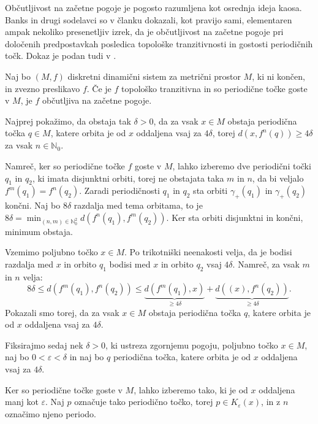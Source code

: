 \documentclass{isrmdelo}
\newcommand{\N}{\mathbb N}
\begin{document}
\bigskip

Občutljivost na začetne pogoje je pogosto razumljena kot osrednja ideja kaosa. Banks in drugi sodelavci so v članku \cite{onchaos} dokazali, kot pravijo sami, elementaren ampak nekoliko presenetljiv izrek, da je občutljivost na začetne pogoje pri določenih predpostavkah posledica topološke tranzitivnosti in gostosti periodičnih točk. Dokaz je podan tudi v \cite{holmgren96,teschl12}.

\begin{izrek}
\label{izrek:obcutljivost}
Naj bo $(M, f)$ diskretni dinamični sistem za metrični prostor $M$, ki ni končen, in zvezno preslikavo $f$. Če je $f$ topološko tranzitivna in so periodične točke goste v $M$, je $f$ občutljiva na začetne pogoje.
\end{izrek}

\begin{dokaz}
Najprej pokažimo, da obstaja tak $\delta > 0$, da za vsak $x \in M$ obstaja periodična točka $q \in M$, katere orbita je od $x$ oddaljena vsaj za $4\delta$, torej $d(x, f^n(q)) \geq 4\delta$ za vsak $n \in \N_0$.

Namreč, ker so periodične točke $f$ goste v $M$, lahko izberemo dve periodični točki $q_1$ in $q_2$, ki imata disjunktni orbiti, torej ne obstajata taka $m$ in $n$, da bi veljalo $f^m(q_1) = f^n(q_2)$. Zaradi periodičnosti $q_1$ in $q_2$ sta orbiti $\gamma_+(q_1)$ in $\gamma_+(q_2)$ končni. Naj bo $8\delta$ razdalja med tema orbitama, to je $8\delta = \min_{(n,m) \in \N_0^2} d(f^n(q_1), f^m(q_2))$. Ker sta orbiti disjunktni in končni, minimum obstaja.

Vzemimo poljubno točko $x \in M$. Po trikotniški neenakosti velja, da je bodisi razdalja med $x$ in orbito $q_1$ bodisi med $x$ in orbito $q_2$ vsaj $4\delta$. Namreč, za vsak $m$ in $n$ velja: $$ 8\delta \leq d(f^m(q_1), f^n(q_2)) \leq \underbrace{d(f^m(q_1), x)}_{\geq 4\delta} + \underbrace{d((x), f^n(q_2))}_{\geq 4\delta}. $$ Pokazali smo torej, da za vsak $x \in M$ obstaja periodična točka $q$, katere orbita je od $x$ oddaljena vsaj za $4\delta$.

\bigskip

Fiksirajmo sedaj nek $\delta > 0$, ki ustreza zgornjemu pogoju, poljubno točko $x \in M$, naj bo $0 < \varepsilon < \delta$ in naj bo $q$ periodična točka, katere orbita je od $x$ oddaljena vsaj za $4\delta$.

Ker so periodične točke goste v $M$, lahko izberemo tako, ki je od $x$ oddaljena manj kot $\varepsilon$. Naj $p$ označuje tako periodično točko, torej $p \in K_\varepsilon(x)$, in z $n$ označimo njeno periodo.


\end{dokaz}
\end{document}
